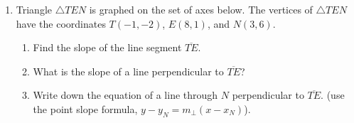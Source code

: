 \documentclass[12pt, twoside]{article}
\begin{document}
\begin{enumerate}
  \item Triangle $\triangle TEN$ is graphed on the set of axes below. The vertices of $\triangle TEN$ have the coordinates $T(-1,-2)$, $E(8,1)$, and $N(3,6)$.
    \begin{center} %
    \end{center}
    \begin{enumerate}
      \item Find the slope of the line segment $\overline{TE}$. \vspace{2.5cm}
      \item What is the slope of a line perpendicular to $\overline{TE}$? \vspace{1.5cm}
      \item Write down the equation of a line through $N$ perpendicular to $\overline{TE}$. (use the point slope formula, $y-y_N=m_\perp (x-x_N)$).  \vspace{1.5cm}
    \end{enumerate}

\end{enumerate}
\newpage
\setcounter{page}{1}
\end{document}
